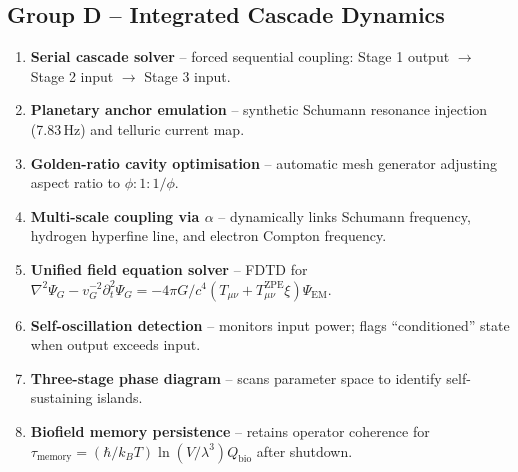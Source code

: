 \documentclass[11pt]{article}
\begin{document}
\subsection{Group D -- Integrated Cascade Dynamics}
\begin{enumerate}[nosep,start=25]
    \item \textbf{Serial cascade solver} -- forced sequential coupling: Stage 1 output $\to$ Stage 2 input $\to$ Stage 3 input.
    \item \textbf{Planetary anchor emulation} -- synthetic Schumann resonance injection (7.83\,Hz) and telluric current map.
    \item \textbf{Golden-ratio cavity optimisation} -- automatic mesh generator adjusting aspect ratio to $\phi:1:1/\phi$.
    \item \textbf{Multi-scale coupling via $\alpha$} -- dynamically links Schumann frequency, hydrogen hyperfine line, and electron Compton frequency.
    \item \textbf{Unified field equation solver} -- FDTD for $\nabla^2\Psi_G - v_G^{-2}\partial_t^2\Psi_G = -4\pi G/c^4 (T_{\mu\nu} + T_{\mu\nu}^{\text{ZPE}}\xi)\Psi_{\text{EM}}$.
    \item \textbf{Self-oscillation detection} -- monitors input power; flags ``conditioned'' state when output exceeds input.
    \item \textbf{Three-stage phase diagram} -- scans parameter space to identify self-sustaining islands.
    \item \textbf{Biofield memory persistence} -- retains operator coherence for $\tau_{\text{memory}} = (\hbar/k_BT)\ln(V/\lambda^3)Q_{\text{bio}}$ after shutdown.
\end{enumerate}
\end{document}
